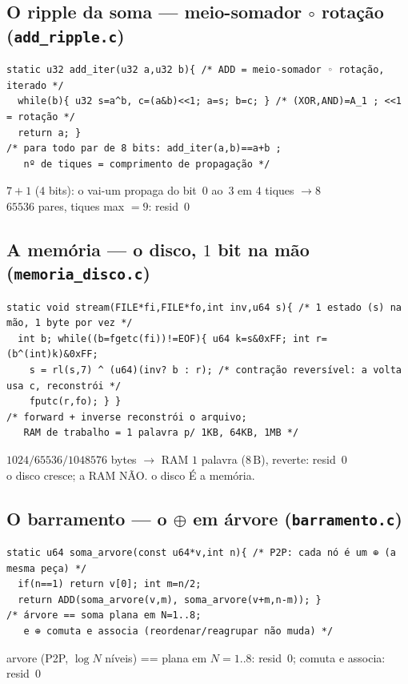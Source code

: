 \documentclass[11pt,a4paper]{article}
\begin{document}
\subsection{O ripple da soma --- meio-somador $\circ$ rotação (\texttt{add\_ripple.c})}
\begin{lstlisting}
static u32 add_iter(u32 a,u32 b){ /* ADD = meio-somador ◦ rotação, iterado */
  while(b){ u32 s=a^b, c=(a&b)<<1; a=s; b=c; } /* (XOR,AND)=A_1 ; <<1 = rotação */
  return a; }
/* para todo par de 8 bits: add_iter(a,b)==a+b ;
   nº de tiques = comprimento de propagação */
\end{lstlisting}
$7+1$ ($4$ bits): o vai-um propaga do bit~$0$ ao~$3$ em $4$ tiques $\to 8$\\
$65536$ pares, tiques max $=9$: resid~$0$

\subsection{A memória --- o disco, $1$ bit na mão (\texttt{memoria\_disco.c})}
\begin{lstlisting}
static void stream(FILE*fi,FILE*fo,int inv,u64 s){ /* 1 estado (s) na mão, 1 byte por vez */
  int b; while((b=fgetc(fi))!=EOF){ u64 k=s&0xFF; int r=(b^(int)k)&0xFF;
    s = rl(s,7) ^ (u64)(inv? b : r); /* contração reversível: a volta usa c, reconstrói */
    fputc(r,fo); } }
/* forward + inverse reconstrói o arquivo;
   RAM de trabalho = 1 palavra p/ 1KB, 64KB, 1MB */
\end{lstlisting}
$1024/65536/1048576$ bytes $\to$ RAM $1$ palavra ($8\,\mathrm{B}$), reverte: resid~$0$\\
o disco cresce; a RAM NÃO. o disco É a memória.

\subsection{O barramento --- o $\oplus$ em árvore (\texttt{barramento.c})}
\begin{lstlisting}
static u64 soma_arvore(const u64*v,int n){ /* P2P: cada nó é um ⊕ (a mesma peça) */
  if(n==1) return v[0]; int m=n/2;
  return ADD(soma_arvore(v,m), soma_arvore(v+m,n-m)); }
/* árvore == soma plana em N=1..8;
   e ⊕ comuta e associa (reordenar/reagrupar não muda) */
\end{lstlisting}
arvore (P2P, $\log N$ níveis) == plana em $N=1..8$: resid~$0$; comuta e associa: resid~$0$
\end{document}

